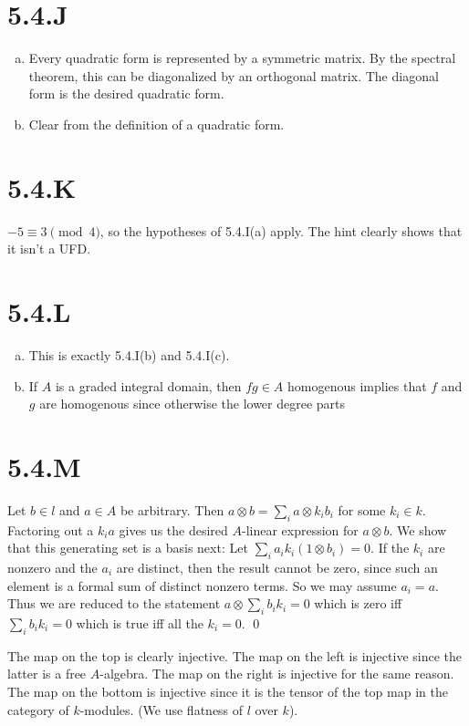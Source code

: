 \documentclass{article}
\begin{document}
\section{5.4.J}
\begin{enumerate}[a.]
    \item Every quadratic form is represented by a symmetric matrix. By the spectral theorem, this can be diagonalized by an orthogonal matrix. The diagonal form is the desired quadratic form.
    \item Clear from the definition of a quadratic form.
\end{enumerate}

\section{5.4.K}
$-5 \equiv 3 \pmod{4}$, so the hypotheses of 5.4.I(a) apply. The hint clearly shows that it isn't a UFD.

\section{5.4.L}
\begin{enumerate}[a.]
    \item This is exactly 5.4.I(b) and 5.4.I(c).
    \item If $A$ is a graded integral domain, then $fg \in A$ homogenous implies that $f$ and $g$ are homogenous since otherwise the lower degree parts
\end{enumerate}

\section{5.4.M}
Let $b \in l$ and $a \in A$ be arbitrary. Then $a \otimes b = \sum_i a \otimes k_ib_i$ for some $k_i \in k$. Factoring out a $k_ia$ gives us the desired $A$-linear expression for $a \otimes b$. We show that this generating set is a basis next: Let $\sum_i a_ik_i(1 \otimes b_i)=0$. If the $k_i$ are nonzero and the $a_i$ are distinct, then the result cannot be zero, since such an element is a formal sum of distinct nonzero terms. So we may assume $a_i=a$. Thus we are reduced to the statement $a \otimes \sum_i b_ik_i=0$ which is zero iff $\sum_i b_ik_i=0$ which is true iff all the $k_i=0$. \qed

The map on the top is clearly injective. The map on the left is injective since the latter is a free $A$-algebra. The map on the right is injective for the same reason. The map on the bottom is injective since it is the tensor of the top map in the category of $k$-modules. (We use flatness of $l$ over $k$).
\end{document}
